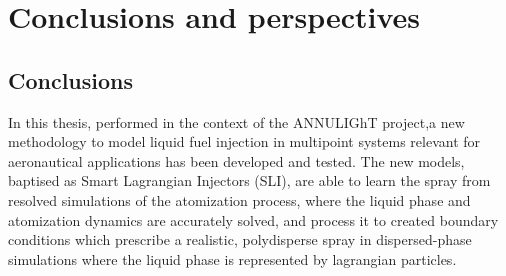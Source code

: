 \chapter{Conclusions and perspectives}

\section*{Conclusions}

In this thesis, performed in the context of the ANNULIGhT project,a new methodology to model liquid fuel injection in multipoint systems relevant for aeronautical applications has been developed and tested. The new models, baptised as Smart Lagrangian Injectors (SLI), are able to learn the spray from resolved simulations of the atomization process, where the liquid phase and atomization dynamics are accurately solved, and process it to created boundary conditions which prescribe a realistic, polydisperse spray in dispersed-phase simulations where the liquid phase is represented by lagrangian particles. 

